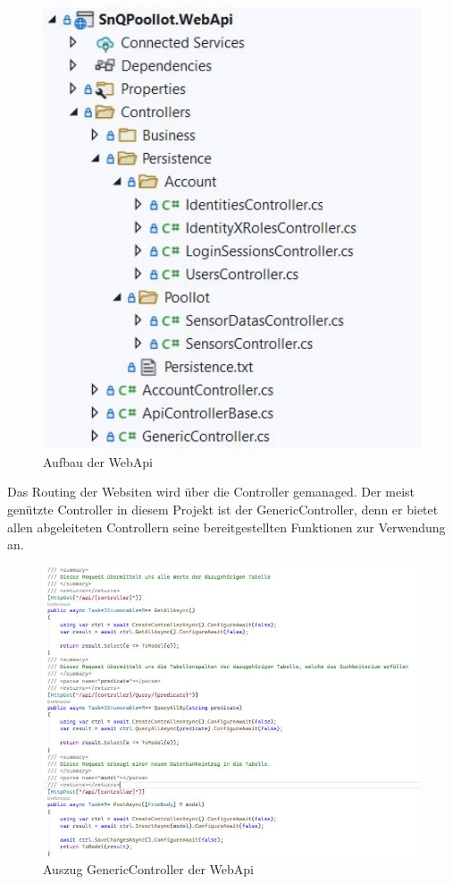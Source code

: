 \begin{figure}[H]
    \centering
    \includegraphics[width=1\textwidth]{pics/HTTPRequestsWebApi.JPG}
    \caption{Aufbau der WebApi}
\end{figure}


Das Routing der Websiten wird über die Controller gemanaged. 
Der meist genützte Controller in diesem Projekt ist der GenericController, denn er bietet allen abgeleiteten Controllern seine bereitgestellten Funktionen zur Verwendung an.

\begin{figure}[H]
    \centering
    \includegraphics[width=1\textwidth]{pics/GenericControllerWebApi.JPG}
    \caption{Auszug GenericController der WebApi}
\end{figure}

